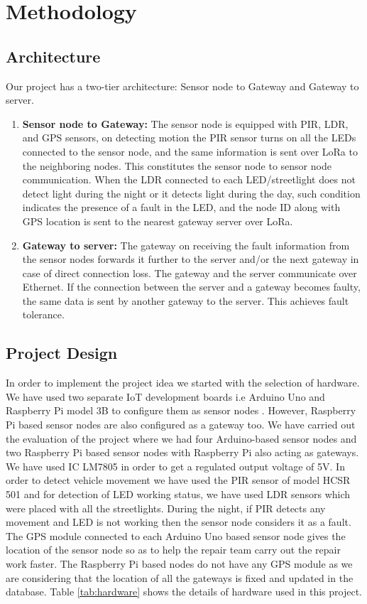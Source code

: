 \documentclass[11pt, oneside]{article}   	%
\begin{document}
\section{Methodology}
\subsection{Architecture}
Our project has a two-tier architecture: Sensor node to Gateway and Gateway to server.
\begin{enumerate}
\item \textbf{Sensor node to Gateway:} The sensor node is equipped with PIR, LDR, and GPS sensors, on detecting motion the PIR sensor turns on all the LEDs connected to the sensor node, and the same information is sent over LoRa to the neighboring nodes. This constitutes the sensor node to sensor node communication. When the LDR connected to each LED/streetlight does not detect light during the night or it detects light during the day, such condition indicates the presence of a fault in the LED, and the node ID along with GPS location is sent to the nearest gateway server over LoRa.\\

\item \textbf{Gateway to server:} The gateway on receiving the fault information from the sensor nodes forwards it further to the server and/or the next gateway in case of direct connection loss. The gateway and the server communicate over Ethernet. If the connection between the server and a gateway becomes faulty, the same data is sent by another gateway to the server. This achieves fault tolerance. \\
\end{enumerate}


\subsection{Project Design}

In order to implement the project idea we started with the selection of hardware. We have used two separate IoT development boards i.e Arduino Uno and Raspberry Pi model 3B to configure them as sensor nodes\cite{11} . However, Raspberry Pi based sensor nodes are also configured as a gateway too. We have carried out the evaluation of the project where we had four Arduino-based sensor nodes and two Raspberry Pi based sensor nodes with Raspberry Pi also acting as gateways. We have used IC LM7805 in order to get a regulated output voltage of 5V. In order to detect vehicle movement we have used the PIR sensor of model HCSR 501 and for detection of LED working status, we have used LDR sensors which were placed with all the streetlights. During the night, if PIR detects any movement and LED is not working then the sensor node considers it as a fault. The GPS module connected to each Arduino Uno based sensor node gives the location of the sensor node so as to help the repair team carry out the repair work faster. The Raspberry Pi based nodes do not have any GPS module as we are considering that the location of all the gateways is fixed and updated in the database. Table \ref{tab:hardware} shows the details of hardware used in this project.
\end{document}
